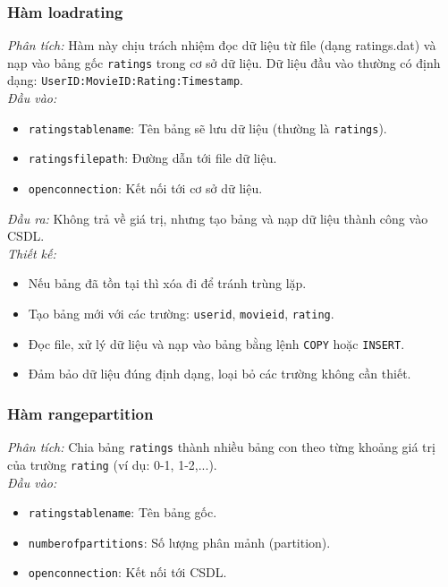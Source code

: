 \documentclass[a4paper]{article}
\begin{document}
\subsubsection{Hàm loadrating}

\textit{Phân tích:}  
Hàm này chịu trách nhiệm đọc dữ liệu từ file (dạng ratings.dat) và nạp vào bảng gốc \texttt{ratings} trong cơ sở dữ liệu. Dữ liệu đầu vào thường có định dạng: \texttt{UserID:MovieID:Rating:Timestamp}.\\

\textit{Đầu vào:}
\begin{itemize}
    \item \texttt{ratingstablename}: Tên bảng sẽ lưu dữ liệu (thường là \texttt{ratings}).
    \item \texttt{ratingsfilepath}: Đường dẫn tới file dữ liệu.
    \item \texttt{openconnection}: Kết nối tới cơ sở dữ liệu.\\
\end{itemize}

\textit{Đầu ra:}  
Không trả về giá trị, nhưng tạo bảng và nạp dữ liệu thành công vào CSDL.\\

\textit{Thiết kế:}
\begin{itemize}
    \item Nếu bảng đã tồn tại thì xóa đi để tránh trùng lặp.
    \item Tạo bảng mới với các trường: \texttt{userid}, \texttt{movieid}, \texttt{rating}.
    \item Đọc file, xử lý dữ liệu và nạp vào bảng bằng lệnh \texttt{COPY} hoặc \texttt{INSERT}.
    \item Đảm bảo dữ liệu đúng định dạng, loại bỏ các trường không cần thiết.
\end{itemize}

\subsubsection{Hàm rangepartition}

\textit{Phân tích:}  
Chia bảng \texttt{ratings} thành nhiều bảng con theo từng khoảng giá trị của trường \texttt{rating} (ví dụ: 0-1, 1-2,...).\\

\textit{Đầu vào:}
\begin{itemize}
    \item \texttt{ratingstablename}: Tên bảng gốc.
    \item \texttt{numberofpartitions}: Số lượng phân mảnh (partition).
    \item \texttt{openconnection}: Kết nối tới CSDL.\\
\end{itemize}
\end{document}
